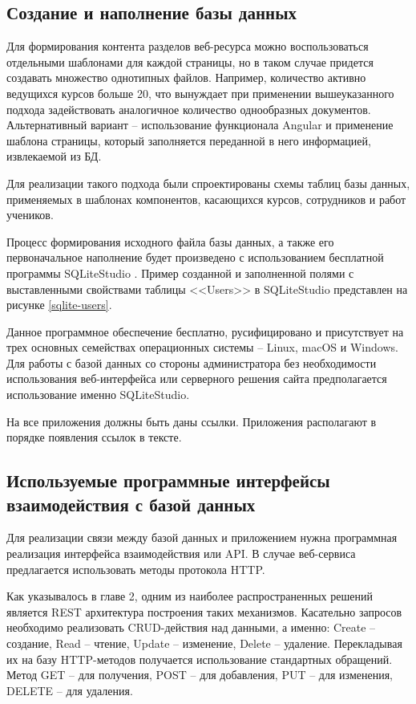 \subsection{Создание и наполнение базы данных}

Для формирования контента разделов веб-ресурса можно воспользоваться отдельными шаблонами для каждой страницы, но в таком случае придется создавать множество однотипных файлов.
Например, количество активно ведущихся курсов больше 20, что вынуждает при применении вышеуказанного подхода задействовать аналогичное количество однообразных документов.
Альтернативный вариант -- использование функционала Angular и применение шаблона страницы, который заполняется переданной в него информацией, извлекаемой из БД.

Для реализации такого подхода были спроектированы схемы таблиц базы данных, применяемых в шаблонах компонентов, касающихся курсов, сотрудников и работ учеников.

Процесс формирования исходного файла базы данных, а также его первоначальное наполнение будет произведено с использованием бесплатной программы SQLiteStudio \cite{sqlitestudio}.
Пример созданной и заполненной полями с выставленными свойствами таблицы <<Users>> в SQLiteStudio представлен на рисунке \ref{sqlite-users}.

Данное программное обеспечение бесплатно, русифицировано и присутствует на трех основных семействах операционных системы -- Linux, macOS и Windows.
Для работы с базой данных со стороны администратора без необходимости использования веб-интерфейса или серверного решения сайта предполагается использование именно SQLiteStudio.

На все приложения должны быть даны ссылки. Приложения располагают в порядке
появления ссылок в тексте.
\subsection{Используемые программные интерфейсы взаимодействия с базой данных}

Для реализации связи между базой данных и приложением нужна программная реализация интерфейса взаимодействия или API.
В случае веб-сервиса предлагается использовать методы протокола HTTP.

Как указывалось в главе 2, одним из наиболее распространенных решений является REST архитектура построения таких механизмов.
Касательно запросов необходимо реализовать CRUD-действия над данными, а именно: Create -- создание, Read -- чтение, Update -- изменение, Delete -- удаление.
Перекладывая их на базу HTTP-методов получается использование стандартных обращений.
Метод GET -- для получения, POST -- для добавления, PUT -- для изменения, DELETE -- для удаления.

